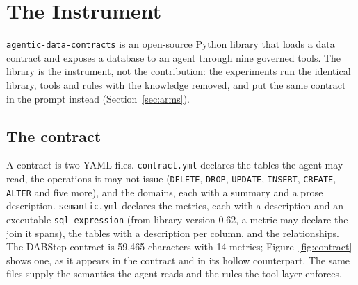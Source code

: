 \section{The Instrument}
\label{sec:system}

\texttt{agentic-data-contracts} is an open-source Python library that loads a
data contract and exposes a database to an agent through nine governed
tools. The library is the instrument, not the contribution: the
experiments run the identical library, tools and rules with the knowledge
removed, and put the same contract in the prompt instead
(Section~\ref{sec:arms}).

\subsection{The contract}
\label{sec:contract}

A contract is two YAML files. \texttt{contract.yml} declares the tables the
agent may read, the operations it may not issue (\texttt{DELETE},
\texttt{DROP}, \texttt{UPDATE}, \texttt{INSERT}, \texttt{CREATE},
\texttt{ALTER} and five more), and the domains, each with a summary and a
prose description. \texttt{semantic.yml} declares the metrics, each with a
description and an executable \texttt{sql\_expression} (from library version 0.62, a
metric may declare the join it spans), the tables with a description per
column, and the relationships. The DABStep contract is 59{,}465 characters
with 14 metrics; Figure~\ref{fig:contract} shows one, as it appears in the
contract and in its hollow counterpart. The same files supply the semantics
the agent reads and the rules the tool layer enforces.

